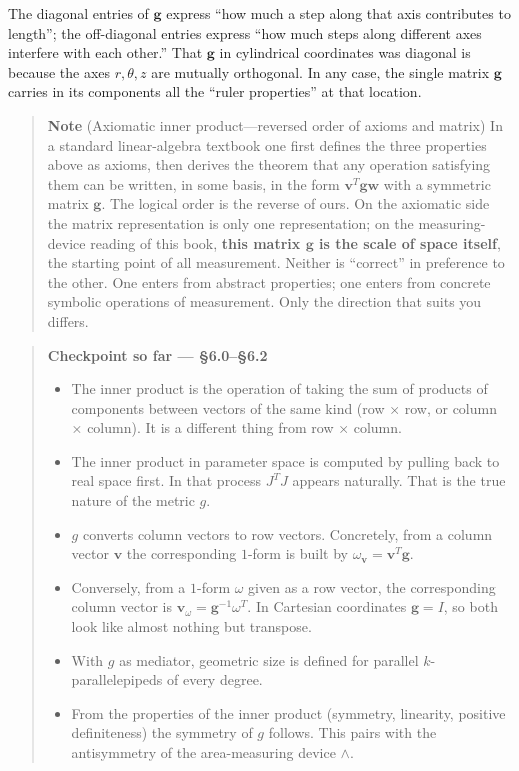 The diagonal entries of \(\mathbf{g}\) express ``how much a step along
that axis contributes to length''; the off-diagonal entries express
``how much steps along different axes interfere with each other.'' That
\(\mathbf{g}\) in cylindrical coordinates was diagonal is because the
axes \(r,\theta,z\) are mutually orthogonal. In any case, the single
matrix \(\mathbf{g}\) carries in its components all the ``ruler
properties'' at that location.

\begin{quote}
\textbf{Note} (Axiomatic inner product---reversed order of axioms and
matrix) In a standard linear-algebra textbook one first defines the
three properties above as axioms, then derives the theorem that any
operation satisfying them can be written, in some basis, in the form
\(\mathbf{v}^T \mathbf{g} \mathbf{w}\) with a symmetric matrix
\(\mathbf{g}\). The logical order is the reverse of ours. On the
axiomatic side the matrix representation is only one representation; on
the measuring-device reading of this book,
\textbf{this matrix $\mathbf{g}$ is the scale of space itself}, the
starting point of all measurement. Neither is ``correct'' in preference
to the other. One enters from abstract properties; one enters from
concrete symbolic operations of measurement. Only the direction that
suits you differs.
\end{quote}

\begin{quote}
\textbf{Checkpoint so far — §6.0–§6.2}

\begin{itemize}
\item
  The inner product is the operation of taking the sum of products of
  components between vectors of the same kind (row × row, or column ×
  column). It is a different thing from row × column.
\item
  The inner product in parameter space is computed by pulling back to
  real space first. In that process \(J^T J\) appears naturally. That is
  the true nature of the metric \(g\).
\item
  \(g\) converts column vectors to row vectors. Concretely, from a
  column vector \(\mathbf{v}\) the corresponding \(1\)-form is built by
  \(\omega_{\mathbf{v}} = \mathbf{v}^T\mathbf{g}\).
\item
  Conversely, from a \(1\)-form \(\omega\) given as a row vector, the
  corresponding column vector is
  \(\mathbf{v}_\omega = \mathbf{g}^{-1}\omega^T\). In Cartesian
  coordinates \(\mathbf{g}=I\), so both look like almost nothing but
  transpose.
\item
  With \(g\) as mediator, geometric size is defined for parallel
  \(k\)-parallelepipeds of every degree.
\item
  From the properties of the inner product (symmetry, linearity,
  positive definiteness) the symmetry of \(g\) follows. This pairs with
  the antisymmetry of the area-measuring device \(\wedge\).
\end{itemize}
\end{quote}


